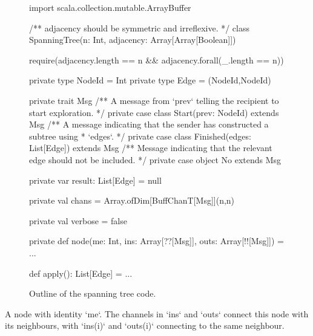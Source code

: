 \begin{figure}
\begin{scala}
import scala.collection.mutable.ArrayBuffer

/** adjacency should be symmetric and irreflexive. */ 
class SpanningTree(n: Int, adjacency: Array[Array[Boolean]]){
  require(adjacency.length == n && adjacency.forall(_.length == n))

  private type NodeId = Int
  private type Edge = (NodeId,NodeId)

  private trait Msg
  /** A message from `prev` telling the recipient to start exploration. */
  private case class Start(prev: NodeId) extends Msg
  /** A message indicating that the sender has constructed a subtree using
    * `edges`. */
  private case class Finished(edges: List[Edge]) extends Msg
  /** Message indicating that the relevant edge should not be included. */
  private case object No extends Msg

  private var result: List[Edge] = null

  private val chans = Array.ofDim[BuffChanT[Msg]](n,n)

  private val verbose = false 

  private def node(me: Int, ins: Array[??[Msg]], outs: Array[!![Msg]]) = ...

  def apply(): List[Edge] = ...
}
\end{scala}
\caption{Outline of the spanning tree code.}
\label{fig:spanning-tree}
\end{figure}


A node with identity `me`.  The channels in `ins` and `outs` connect this
node with its neighbours, with `ins(i)` and `outs(i)` connecting to the
same neighbour. 

